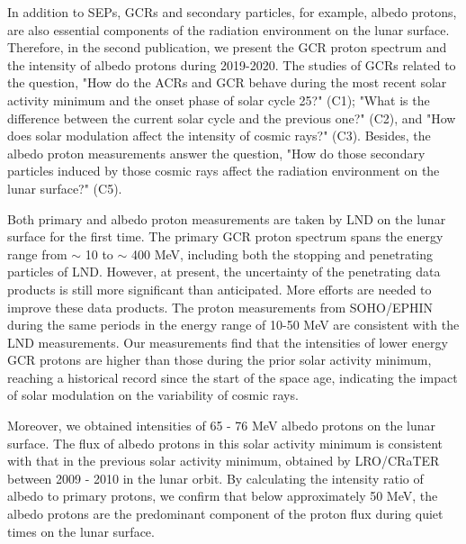 In addition to \acp{SEP}, \acp{GCR} and secondary particles, for example, albedo protons, are also essential components of the radiation environment on the lunar surface. Therefore, in the second publication, we present the \ac{GCR} proton spectrum and the intensity of albedo protons during 2019-2020. The studies of \acp{GCR} related to the question, "How do the \acp{ACR} and \ac{GCR} behave during the most recent solar activity minimum and the onset phase of solar cycle 25?" (C1); "What is the difference between the current solar cycle and the previous one?" (C2), and "How does solar modulation affect the intensity of cosmic rays?" (C3). Besides, the albedo proton measurements answer the question, "How do those secondary particles induced by those cosmic rays affect the radiation environment on the lunar surface?" (C5).

Both primary and albedo proton measurements are taken by \ac{LND} on the lunar surface for the first time. The primary \ac{GCR} proton spectrum spans the energy range from $\sim$ 10 to $\sim$ 400 MeV, including both the stopping and penetrating particles of \ac{LND}. However, at present, the uncertainty of the penetrating data products is still more significant than anticipated. More efforts are needed to improve these data products. The proton measurements from \acs{SOHO}/\acs{EPHIN} during the same periods in the energy range of 10-50 MeV are consistent with the \ac{LND} measurements. Our measurements find that the intensities of lower energy \ac{GCR} protons are higher than those during the prior solar activity minimum, reaching a historical record since the start of the space age, indicating the impact of solar modulation on the variability of cosmic rays.

Moreover, we obtained intensities of 65 - 76 MeV albedo protons on the lunar surface. The flux of albedo protons in this solar activity minimum is consistent with that in the previous solar activity minimum, obtained by \acs{LRO}/\acs{CRaTER} between 2009 - 2010 in the lunar orbit. By calculating the intensity ratio of albedo to primary protons, we confirm that below approximately 50 MeV, the albedo protons are the predominant component of the proton flux during quiet times on the lunar surface. 



